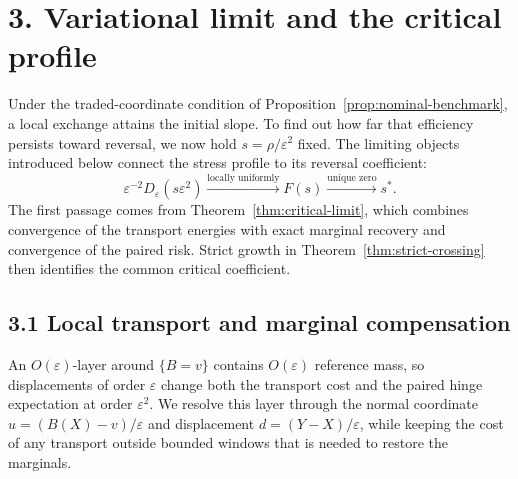 \section{3. Variational limit and the critical profile}\label{sec:variational-limit}

Under the traded-coordinate condition of Proposition~\ref{prop:nominal-benchmark}, a local exchange attains the initial slope. To find out how far that efficiency persists toward reversal, we now hold \(s=\rho/\varepsilon^2\) fixed. The limiting objects introduced below connect the stress profile to its reversal coefficient:
\[
\varepsilon^{-2}D_\varepsilon(s\varepsilon^2)
\xrightarrow{\text{locally uniformly}}
F(s)
\xrightarrow{\text{unique zero}}
s^*.
\]
The first passage comes from Theorem~\ref{thm:critical-limit}, which combines convergence of the transport energies with exact marginal recovery and convergence of the paired risk. Strict growth in Theorem~\ref{thm:strict-crossing} then identifies the common critical coefficient.

\subsection{3.1 Local transport and marginal compensation}\label{sec:limit-geometry}
An \(O(\varepsilon)\)-layer around \(\{B=v\}\) contains \(O(\varepsilon)\) reference mass, so displacements of order \(\varepsilon\) change both the transport cost and the paired hinge expectation at order \(\varepsilon^2\). We resolve this layer through the normal coordinate \(u=(B(X)-v)/\varepsilon\) and displacement \(d=(Y-X)/\varepsilon\), while keeping the cost of any transport outside bounded windows that is needed to restore the marginals.

